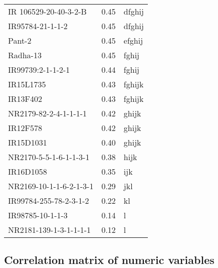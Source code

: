 \documentclass[]{article}
\begin{document}
\begin{longtable}{lll}
IR 106529-20-40-3-2-B & 0.45 & dfghij\\
\rowcolor{gray!6}  IR95784-21-1-1-2 & 0.45 & dfghij\\
Pant-2 & 0.45 & efghij\\
\addlinespace
\rowcolor{gray!6}  Radha-13 & 0.45 & fghij\\
IR99739:2-1-1-2-1 & 0.44 & fghij\\
\rowcolor{gray!6}  IR15L1735 & 0.43 & fghijk\\
IR13F402 & 0.43 & fghijk\\
\rowcolor{gray!6}  NR2179-82-2-4-1-1-1-1 & 0.42 & ghijk\\
\addlinespace
IR12F578 & 0.42 & ghijk\\
\rowcolor{gray!6}  IR15D1031 & 0.40 & ghijk\\
NR2170-5-5-1-6-1-1-3-1 & 0.38 & hijk\\
\rowcolor{gray!6}  IR16D1058 & 0.35 & ijk\\
NR2169-10-1-1-6-2-1-3-1 & 0.29 & jkl\\
\addlinespace
\rowcolor{gray!6}  IR99784-255-78-2-3-1-2 & 0.22 & kl\\
IR98785-10-1-1-3 & 0.14 & l\\
\rowcolor{gray!6}  NR2181-139-1-3-1-1-1-1 & 0.12 & l\\
\bottomrule
\end{longtable}
\endgroup{}

\subsection{Correlation matrix of numeric
variables}\label{correlation-matrix-of-numeric-variables}
\end{document}
